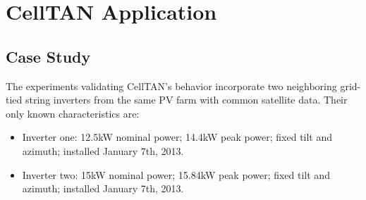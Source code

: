 \chapter{CellTAN Application} \label{chap:chap5}


\section{Case Study} \label{sec:case_study}


The experiments validating CellTAN's behavior incorporate two neighboring grid-tied string inverters from the same PV farm with common satellite data. Their only known characteristics are:

\begin{itemize}
    \item Inverter one: 12.5kW nominal power; 14.4kW peak power; fixed tilt and azimuth; installed January 7th, 2013.
    \item Inverter two: 15kW nominal power; 15.84kW peak power; fixed tilt and azimuth; installed January 7th, 2013.
\end{itemize}

